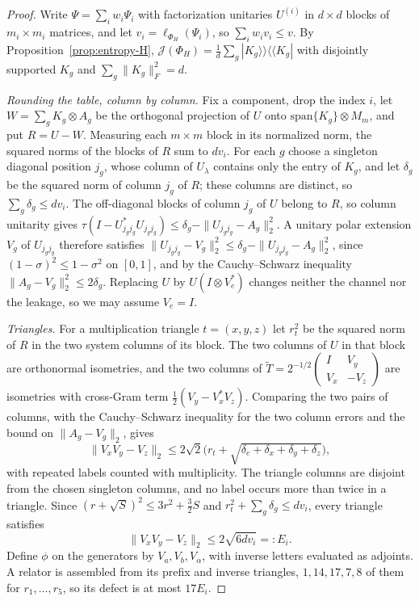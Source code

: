 \documentclass[11pt,a4paper]{article}
\theoremstyle{plain}
\theoremstyle{definition}
\theoremstyle{remark}
\begin{document}
\begin{proof}
Write $\Psi=\sum_iw_i\Psi_i$ with factorization unitaries $U^{(i)}$ in $d\times d$ blocks of $m_i\times m_i$ matrices, and let
$v_i=\ell_{\Phi_H}(\Psi_i)$, so $\sum_iw_iv_i\le v$. By Proposition~\ref{prop:entropy-H},
$\mathcal J(\Phi_H)=\frac1d\sum_g|K_g\rangle\!\rangle\langle\!\langle K_g|$ with disjointly supported $K_g$ and $\sum_g\|K_g\|_F^2=d$.

\emph{Rounding the table, column by column.} Fix a component, drop the index $i$, let $W=\sum_gK_g\otimes A_g$ be the orthogonal
projection of $U$ onto $\mathrm{span}\{K_g\}\otimes M_m$, and put $R=U-W$. Measuring each $m\times m$ block in its normalized norm, the
squared norms of the blocks of $R$ sum to $dv_i$. For each $g$ choose a singleton diagonal position $j_g$, whose column of $U_\lambda$
contains only the entry of $K_g$, and let $\delta_g$ be the squared norm of column $j_g$ of $R$; these columns are distinct, so
$\sum_g\delta_g\le dv_i$. The off-diagonal blocks of column $j_g$ of $U$ belong to $R$, so column unitarity gives
$\tau(I-U_{j_gj_g}^*U_{j_gj_g})\le\delta_g-\|U_{j_gj_g}-A_g\|_2^2$. A unitary polar extension $V_g$ of $U_{j_gj_g}$ therefore satisfies
$\|U_{j_gj_g}-V_g\|_2^2\le\delta_g-\|U_{j_gj_g}-A_g\|_2^2$, since $(1-\sigma)^2\le1-\sigma^2$ on $[0,1]$, and by the Cauchy--Schwarz inequality
$\|A_g-V_g\|_2^2\le2\delta_g$. Replacing $U$ by $U(I\otimes V_e^*)$ changes neither the channel nor the leakage, so we may assume $V_e=I$.

\emph{Triangles.} For a multiplication triangle $t=(x,y,z)$ let $r_t^2$ be the squared norm of $R$ in the two system columns of its
block. The two columns of $U$ in that block are orthonormal isometries, and the two columns of
$\widetilde T=2^{-1/2}\left(\begin{smallmatrix}I&V_y\\V_x&-V_z\end{smallmatrix}\right)$ are isometries with cross-Gram term
$\frac12(V_y-V_x^*V_z)$. Comparing the two pairs of columns, with the Cauchy--Schwarz inequality for the two column errors and the
bound on $\|A_g-V_g\|_2$, gives
\[
\|V_xV_y-V_z\|_2\le2\sqrt2\Big(r_t+\sqrt{\delta_e+\delta_x+\delta_y+\delta_z}\Big),
\]
with repeated labels counted with multiplicity. The triangle columns are disjoint from the chosen singleton columns, and no label occurs more than twice in a
triangle. Since
$(r+\sqrt S)^2\le3r^2+\frac32S$ and $r_t^2+\sum_g\delta_g\le dv_i$, every triangle satisfies
\[
\|V_xV_y-V_z\|_2\le2\sqrt{6dv_i}=:E_i .
\]
Define $\phi$ on the generators by $V_a,V_b,V_\alpha$, with inverse letters evaluated as adjoints. A relator is assembled from its prefix
and inverse triangles, $1,14,17,7,8$ of them for $r_1,\dots,r_5$, so its defect is at most $17E_i$.


\end{proof}
\end{document}
